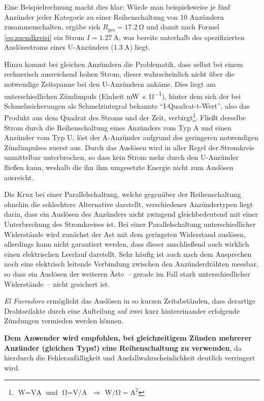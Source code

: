 \documentclass[paper=a4, parskip, numbers=noenddot, toc=listof, headsepline]{scrbook}
\newcommand{\anlage}{\emph{El Fueradoro}}
\begin{document}
				Eine Beispielrechnung macht dies klar: Würde man beispielsweise je fünf Anzünder jeder Kategorie zu einer Reihenschaltung von 10 Anzündern zusammenschalten, ergäbe sich $R_\text{ges} = \SI{17,2}{\ohm}$ und damit nach Formel \eqref{eq:zuendkreisi} ein Strom $I = \SI{1,27}{\ampere}$, was bereits unterhalb des spezifizierten Auslösestroms eines U-Anzünders ($\SI{1,3}{\ampere}$) liegt.

				Hinzu kommt bei gleichen Anzündern die Problematik, dass selbst bei einem rechnerisch ausreichend hohen Strom, dieser wahrscheinlich nicht über die notwendige Zeitspanne bei den U-Anzündern ankäme. Dies liegt am unterschiedlichen Zündimpuls (Einheit \si{\milli\watt\second\per\ohm}), hinter dem sich der bei Schmelzsicherungen als Schmelzintegral bekannte \enquote{I-Quadrat-t-Wert}, also das Produkt aus dem Quadrat des Stroms und der Zeit, verbirgt\footnote{$\si{\watt} = \si{\volt\ampere}$ und $\si{\ohm} = \si{\volt\per\ampere}$ $\Rightarrow$ $\si{\watt\per\ohm} = \si{\square\ampere}$}. Fließt derselbe Strom durch die Reihenschaltung eines Anzünders vom Typ A und einen Anzünder vom Typ U, löst der A-Anzünder aufgrund des geringeren notwendigen Zündimpulses zuerst aus. Durch das Auslösen wird in aller Regel der Stromkreis unmittelbar unterbrochen, so dass kein Strom mehr durch den U-Anzünder fließen kann, weshalb die ihn ihm umgesetzte Energie nicht zum Auslösen ausreicht.

				Die Krux bei einer Parallelschaltung, welche gegenüber der Reihenschaltung ohnehin die schlechtere Alternative darstellt, verschiedener Anzündertypen liegt darin, dass ein Auslösen des Anzünders nicht zwingend gleichbedeutend mit einer Unterbrechung des Stromkreises ist. Bei einer Parallelschaltung unterschiedlicher Widerstände wird zunächst der Ast mit dem geringsten Widerstand auslösen, allerdings kann nicht garantiert werden, dass dieser anschließend auch wirklich einen elektrischen Leerlauf darstellt. Sehr häufig ist auch nach dem Ansprechen noch eine elektrisch leitende Verbindung zwischen den Anzünderdrähten messbar, so dass ein Auslösen der weiteren Äste~-- gerade im Fall stark unterschiedlicher Widerstände~-- nicht gesichert ist.

				{\anlage} ermöglicht das Auslösen in so kurzen Zeitabständen, dass derartige Drahtseilakte durch eine Aufteilung auf zwei kurz hintereinander erfolgende Zündungen vermieden werden können.

				\textbf{Dem Anwender wird empfohlen, bei gleichzeitigem Zünden mehrerer Anzünder (gleichen Typs!) eine Reihenschaltung zu verwenden}, da hierdurch die Fehleranfälligkeit und Ausfallwahrscheinlichkeit deutlich verringert wird.
\end{document}
